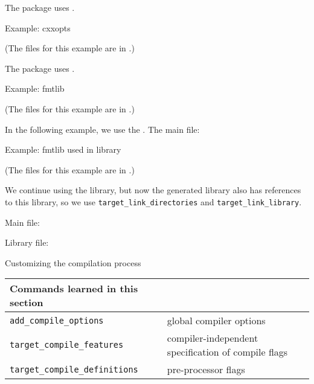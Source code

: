 The  package uses .




 {Example: cxxopts}

(The files for this example are in .)

The  package uses .




 {Example: fmtlib}

(The files for this example are in .)

In the following example, we use the .
The main  file:
%


 {Example: fmtlib used in library}

(The files for this example are in .)

We continue using the  library,
but now the generated library also has references to this library,
so we use \lstinline+target_link_directories+ and \lstinline+target_link_library+.

Main file:
%


Library file:
%



 {Customizing the compilation process}

\begin{tabular}{lp{3in}}
  \toprule
  Commands learned in this section\\
  \midrule
  \lstinline+add_compile_options+&global compiler options\\
  \lstinline+target_compile_features+&compiler-independent specification of compile flags\\
  \lstinline+target_compile_definitions+&pre-processor flags\\
  \bottomrule
\end{tabular}


